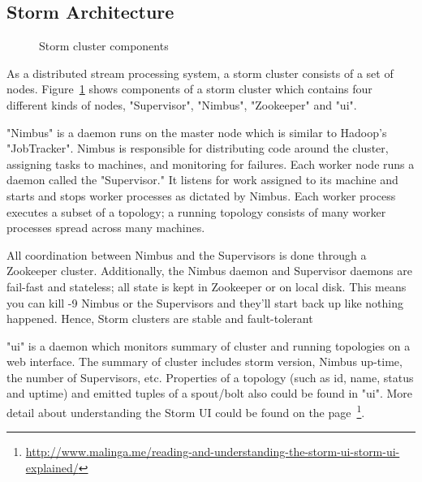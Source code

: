 \subsection{Storm Architecture}
\begin{figure}
  \begin{center}
   \caption{Storm cluster components}
   \label{fig:storm_cluster}
  \end{center}
\end{figure}

As a distributed stream processing system, a storm cluster consists of a set of nodes. Figure~\ref{fig:storm_cluster} shows components of a storm cluster which contains four different kinds of nodes, "Supervisor", "Nimbus", "Zookeeper" and "ui". 

"Nimbus" is a daemon runs on the master node which is similar to Hadoop's "JobTracker". Nimbus is responsible for distributing code around the cluster, assigning tasks to machines, and monitoring for failures. Each worker node runs a daemon called the "Supervisor." It listens for work assigned to its machine and starts and stops worker processes as dictated by Nimbus. Each worker process executes a subset of a topology; a running topology consists of many worker processes spread across many machines.

All coordination between Nimbus and the Supervisors is done through a Zookeeper cluster. Additionally, the Nimbus daemon and Supervisor daemons are fail-fast and stateless; all state is kept in Zookeeper or on local disk. This means you can kill -9 Nimbus or the Supervisors and they'll start back up like nothing happened. Hence, Storm clusters are stable and fault-tolerant

"ui" is a daemon which monitors summary of cluster and running topologies on a web interface. The summary of cluster includes storm version, Nimbus up-time, the number of Supervisors, etc. Properties of a topology (such as id, name, status and uptime) and emitted tuples of a spout/bolt also could be found in "ui". More detail about understanding the Storm UI could be found on the page~\footnote{\url{http://www.malinga.me/reading-and-understanding-the-storm-ui-storm-ui-explained/}}.


